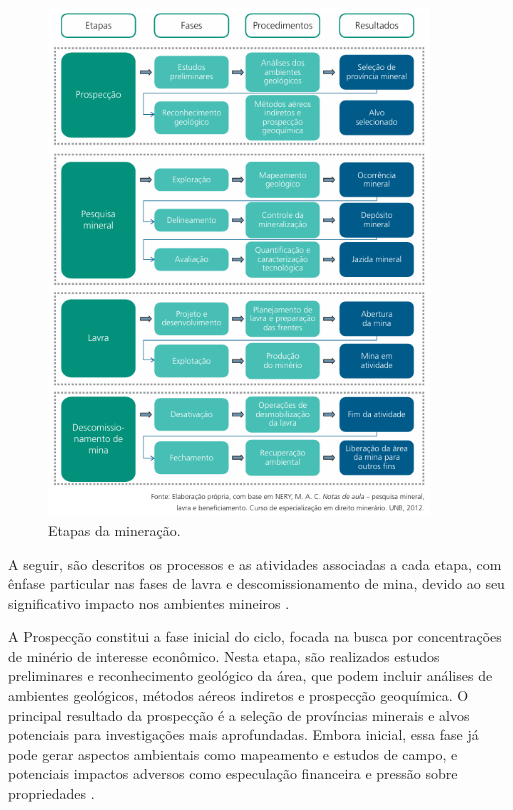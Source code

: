 \begin{figure}[!htb]
    \centering
    \includegraphics[width=0.9\textwidth]{figures/image14_etapas_mineracao.png}
    \caption{Etapas da mineração.}
    \label{fig:etapas_mineracao}
\end{figure}

A seguir, são descritos os processos e as atividades associadas a cada etapa, com ênfase particular nas fases de lavra e descomissionamento de mina, devido ao seu significativo impacto nos ambientes mineiros \cite{carvalho2018}.

A Prospecção constitui a fase inicial do ciclo, focada na busca por concentrações de minério de interesse econômico. Nesta etapa, são realizados estudos preliminares e reconhecimento geológico da área, que podem incluir análises de ambientes geológicos, métodos aéreos indiretos e prospecção geoquímica. O principal resultado da prospecção é a seleção de províncias minerais e alvos potenciais para investigações mais aprofundadas. Embora inicial, essa fase já pode gerar aspectos ambientais como mapeamento e estudos de campo, e potenciais impactos adversos como especulação financeira e pressão sobre propriedades \cite{freire2020}.

